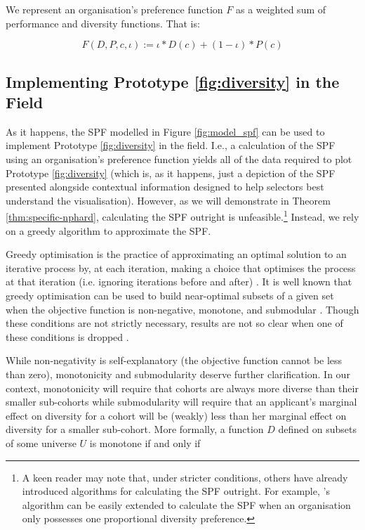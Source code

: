 We represent an organisation's preference function $F$ as a weighted sum of performance and diversity functions. That is:

\begin{equation}\label{eq:f_spec}
F(D, P, c, \iota) := \iota*D(c)+(1-\iota)*P(c)
\end{equation}

\subsection{Implementing Prototype \ref{fig:diversity} in the Field}\label{sec:spf_alg}
As it happens, the SPF modelled in Figure \ref{fig:model_spf} can be used to implement Prototype \ref{fig:diversity} in the field. I.e., a calculation of the SPF using an organisation's preference function yields all of the data required to plot Prototype \ref{fig:diversity} (which is, as it happens, just a depiction of the SPF presented alongside contextual information designed to help selectors best understand the visualisation). However, as we will demonstrate in Theorem \ref{thm:specific-nphard}, calculating the SPF outright is unfeasible.\footnote{A keen reader may note that, under stricter conditions, others have already introduced algorithms for calculating the SPF outright. For example, \textcite{kleinberg2018algorithmic}'s algorithm can be easily extended to calculate the SPF when an organisation only possesses one proportional diversity preference.} Instead, we rely on a greedy algorithm to approximate the SPF.

Greedy optimisation is the practice of approximating an optimal solution to an iterative process by, at each iteration, making a choice that optimises the process at that iteration (i.e. ignoring iterations before and after) \cite{nemhauser1978analysis}. It is well known that greedy optimisation can be used to build near-optimal subsets of a given set when the objective function is non-negative, monotone, and submodular \cite{Feldman_Harshaw_Karbasi_2017,nemhauser1978analysis}. Though these conditions are not strictly necessary, results are not so clear when one of these conditions is dropped \cite{Feldman_Harshaw_Karbasi_2017}.

While non-negativity is self-explanatory (the objective function cannot be less than zero), monotonicity and submodularity deserve further clarification. In our context, monotonicity will require that cohorts are always more diverse than their smaller sub-cohorts while submodularity will require that an applicant's marginal effect on diversity for a cohort will be (weakly) less than her marginal effect on diversity for a smaller sub-cohort. More formally, a function $D$ defined on subsets of some universe $U$ is monotone if and only if 

